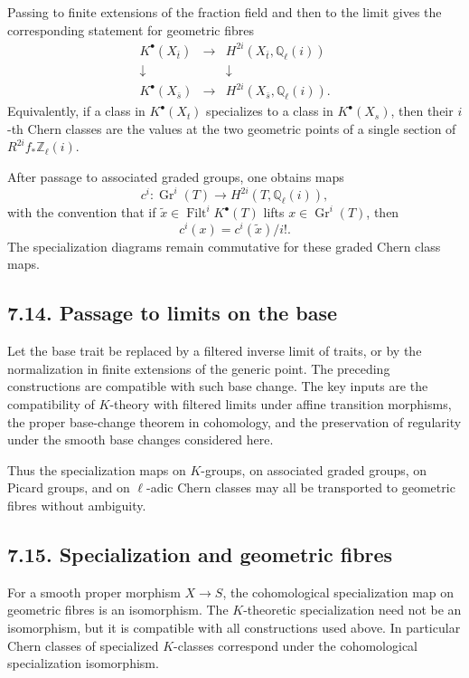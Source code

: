 \documentclass[12pt]{article}
\newcommand{\ZZ}{\mathbb Z}
\newcommand{\QQ}{\mathbb Q}
\newcommand{\Gr}{\operatorname{Gr}}
\newcommand{\Filt}{\operatorname{Filt}}
\newcommand{\longto}{\longrightarrow}
\begin{document}
Passing to finite extensions of the fraction field and then to the limit gives the corresponding statement for geometric fibres
\[
\begin{array}{ccc}
K^\bullet(X_{\bar t})&\longto&H^{2i}(X_{\bar t},\QQ_\ell(i))\\
\downarrow&&\downarrow\\
K^\bullet(X_{\bar s})&\longto&H^{2i}(X_{\bar s},\QQ_\ell(i)).
\end{array}
\]
Equivalently, if a class in $K^\bullet(X_t)$ specializes to a class in $K^\bullet(X_s)$, then their $i$-th Chern classes are the values at the two geometric points of a single section of $R^{2i}f_*\ZZ_\ell(i)$.

After passage to associated graded groups, one obtains maps
\[
c^i:\Gr^i(T)\longto H^{2i}(T,\QQ_\ell(i)),
\]
with the convention that if $\tilde x\in\Filt^iK^\bullet(T)$ lifts $x\in\Gr^i(T)$, then
\[
c^i(x)=c^i(\tilde x)/i!.
\]
The specialization diagrams remain commutative for these graded Chern class maps.

\subsection*{7.14. Passage to limits on the base}

Let the base trait be replaced by a filtered inverse limit of traits, or by the normalization in finite extensions of the generic point. The preceding constructions are compatible with such base change. The key inputs are the compatibility of $K$-theory with filtered limits under affine transition morphisms, the proper base-change theorem in cohomology, and the preservation of regularity under the smooth base changes considered here.

Thus the specialization maps on $K$-groups, on associated graded groups, on Picard groups, and on $\ell$-adic Chern classes may all be transported to geometric fibres without ambiguity.

\subsection*{7.15. Specialization and geometric fibres}

For a smooth proper morphism $X\to S$, the cohomological specialization map on geometric fibres is an isomorphism. The $K$-theoretic specialization need not be an isomorphism, but it is compatible with all constructions used above. In particular Chern classes of specialized $K$-classes correspond under the cohomological specialization isomorphism.
\end{document}
